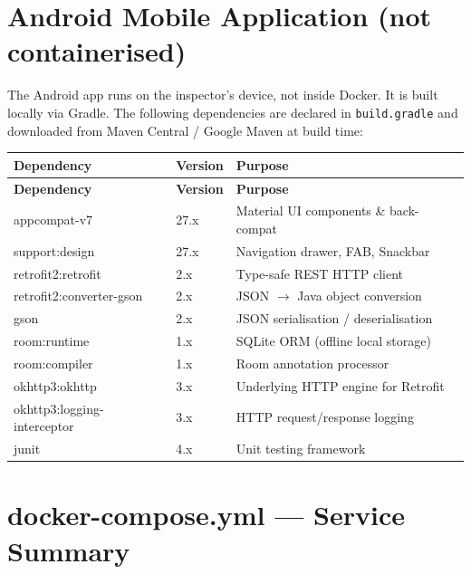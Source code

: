 \documentclass[12pt,letterpaper]{article}
\begin{document}
\section{Android Mobile Application \textnormal{\small(not containerised)}}

The Android app runs on the inspector's device, not inside Docker. It is
built locally via Gradle. The following dependencies are declared in
\texttt{build.gradle} and downloaded from Maven Central / Google Maven at
build time:

\vspace{0.5em}
\begin{longtable}{p{5.5cm} p{1.8cm} p{6cm}}
  \rowcolor{headerblue}
  \color{white}\textbf{Dependency} &
  \color{white}\textbf{Version} &
  \color{white}\textbf{Purpose} \\
  \endfirsthead
  \rowcolor{headerblue}
  \color{white}\textbf{Dependency} &
  \color{white}\textbf{Version} &
  \color{white}\textbf{Purpose} \\
  \endhead
  appcompat-v7                    & 27.x & Material UI components \& back-compat \\
  \rowcolor{rowshade}
  support:design                  & 27.x & Navigation drawer, FAB, Snackbar \\
  retrofit2:retrofit              & 2.x  & Type-safe REST HTTP client \\
  \rowcolor{rowshade}
  retrofit2:converter-gson        & 2.x  & JSON $\to$ Java object conversion \\
  gson                            & 2.x  & JSON serialisation / deserialisation \\
  \rowcolor{rowshade}
  room:runtime                    & 1.x  & SQLite ORM (offline local storage) \\
  room:compiler                   & 1.x  & Room annotation processor \\
  \rowcolor{rowshade}
  okhttp3:okhttp                  & 3.x  & Underlying HTTP engine for Retrofit \\
  okhttp3:logging-interceptor     & 3.x  & HTTP request/response logging \\
  \rowcolor{rowshade}
  junit                           & 4.x  & Unit testing framework \\
\end{longtable}

\section{docker-compose.yml — Service Summary}
\end{document}
